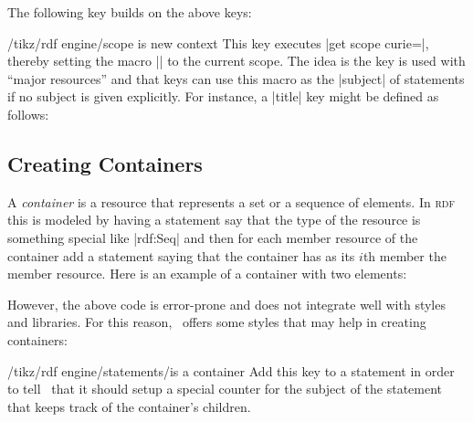 The following key builds on the above keys:
\begin{key}{/tikz/rdf engine/scope is new context}
  This key executes |get scope curie=\tikzrdfcontext|, thereby
  setting the macro |\tikzrdfcontext| to the current scope. The idea
  is the key is used with ``major resources'' and that keys can
  use this macro as the |subject| of statements if no subject is given
  explicitly. For instance, a |title| key might be defined as follows: 
\end{key}


\subsection{Creating Containers}

A \emph{container} is a resource that represents a set or a sequence
of elements. In \textsc{rdf} this is modeled by having a statement say
that the type of the resource is something special like |rdf:Seq| and
then for each member resource of the container add a statement saying
that the container has as its $i$th member the  member resource. Here
is an example of a container with two elements:

\begin{codeexample}
\end{codeexample}

However, the above code is error-prone and does not integrate well
with styles and libraries. For this reason, \tikzname\ offers some
styles that may help in creating containers:

\begin{key}{/tikz/rdf engine/statements/is a container}
  Add this key to a statement in order to tell \tikzname\ that it
  should setup a special counter for the subject of the statement that
  keeps track of the container's children.   
\end{key}


